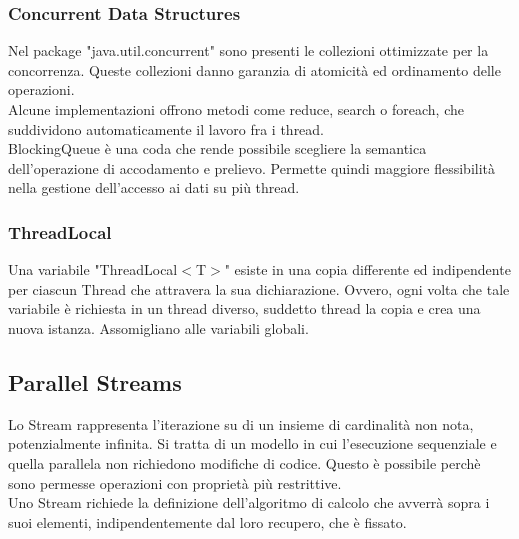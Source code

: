\documentclass{article}
\begin{document}
\subsubsection{Concurrent Data Structures}

Nel package "java.util.concurrent" sono presenti le collezioni ottimizzate per
la concorrenza. Queste collezioni danno garanzia di atomicità ed ordinamento
delle operazioni.\\
Alcune implementazioni offrono metodi come reduce, search o foreach, che
suddividono automaticamente il lavoro fra i thread.\\

BlockingQueue è una coda che rende possibile scegliere la semantica
dell'operazione di accodamento e prelievo. Permette quindi maggiore
flessibilità nella gestione dell'accesso ai dati su più thread.

\subsubsection{ThreadLocal}

Una variabile "ThreadLocal$<$T$>$" esiste in una copia differente ed indipendente
per ciascun Thread che attravera la sua dichiarazione. Ovvero, ogni volta che
tale variabile è richiesta in un thread diverso, suddetto thread la copia e 
crea una nuova istanza. Assomigliano alle variabili globali.

\subsection{Parallel Streams}
Lo Stream rappresenta l'iterazione su di un insieme di cardinalità non nota,
potenzialmente infinita. Si tratta di un modello in cui l'esecuzione sequenziale
e quella parallela non richiedono modifiche di codice. Questo è possibile perchè
sono permesse operazioni con proprietà più restrittive.\\
Uno Stream richiede la definizione dell'algoritmo di calcolo che avverrà sopra i
suoi elementi, indipendentemente dal loro recupero, che è fissato.
\end{document}
